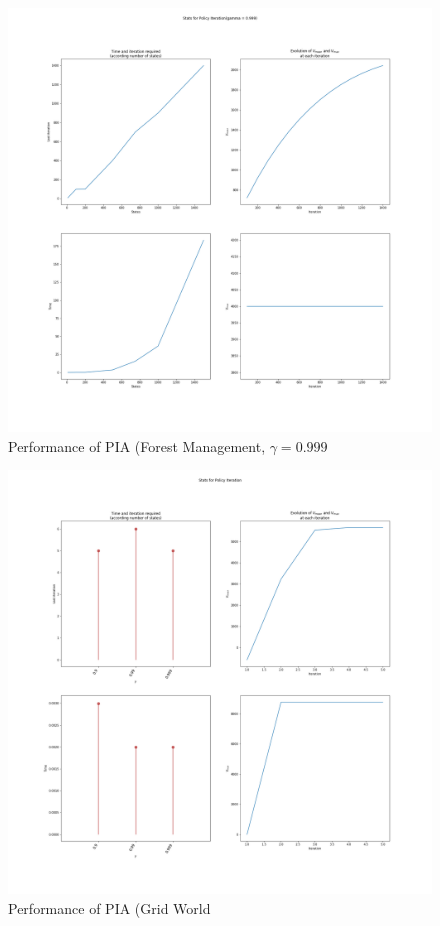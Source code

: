 \documentclass[11pt]{article}
\begin{document}
\begin{multicols}{2}
\begin{figure}[H]
\centering
\includegraphics[width = 0.9\columnwidth]{PI_FM_0.999.png}
\caption{Performance of PIA (Forest Management, $\gamma = 0.999$}
\end{figure}

\begin{figure}[H]
\centering
\includegraphics[width = 0.9\columnwidth]{PI_GW.png}
\caption{Performance of PIA (Grid World}
\end{figure}


\end{multicols}
\end{document}
